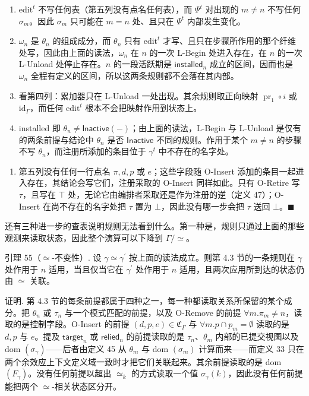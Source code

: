 \documentclass[
  10
]{article}
\providecommand{\tightlist}{%
  \setlength{\itemsep}{0pt}\setlength{\parskip}{0pt}}
\begin{document}
\begin{enumerate}
\def\labelenumi{(\arabic{enumi})}
\item
  $\mathrm{edit}^{t}$ 不写任何表（第五列没有点名任何表），而 $\Psi ^ { t }$ 对出现的 $m \neq n$ 不写任何 $\sigma _ { m }$。因此 $\sigma _ { m }$ 只可能在 $m = n$ 处、且只在 $\Psi ^ { t }$ 内部发生变化。
\item
  $\omega _ { n }$ 是 $\theta _ { n }$ 的组成成分，而 $\theta _ { n }$ 只有 $\mathrm{edit}^{t}$ 才写、且只在步骤所作用的那个纤维处写，因此由上面的读法，$\omega _ { n }$ 在 $n$ 的一次 L-Begin 处进入存在，在 $n$ 的一次 L-Unload 处停止存在。$n$ 的一段活跃期是 $\mathsf{installed}_{n}$ 成立的区间，因而也是 $\omega _ { n }$ 全程有定义的区间，所以这两条规则都不会落在其内部。
\item
  看第四列：累加器只在 L-Unload 一处出现。其余规则取正向映射 $\operatorname { p r } _ { 1 } \circ i$ 或 $\mathrm { i d } _ { \Gamma }$，而任何 $\mathrm{edit}^{t}$ 根本不会把映射作用到状态上。
\item
  installed 即 $\theta _ { n } \neq \mathsf { I n a c t i v e } ( - )$；由上面的读法，L-Begin 与 L-Unload 是仅有的两条前提与结论中 $\theta _ { n }$ 是否 $\mathsf{Inactive}$ 不同的规则。作用于某个 $m \neq n$ 的步骤不写 $\theta _ { n }$，而注册所添加的条目位于 $\gamma ^ { t }$ 中不存在的名字处。
\end{enumerate}

\begin{enumerate}
\def\labelenumi{(\arabic{enumi})}
\setcounter{enumi}{4}
\tightlist
\item
  第五列没有任何一行点名 $\pi , d , p$ 或 $e$；这些字段随 O-Insert 添加的条目一起进入存在，其结论会写它们，注册采取的 O-Insert 同样如此。只有 O-Retire 写 $\tau$，且写在 $\top$ 处，无论它由编排者采取还是作为注册的逆（定义 47）；O-Insert 在尚不存在的名字处把 $\tau$ 置为 $\bot$，因此没有哪一步会把 $\tau$ 送回 $\bot$。$\blacksquare$
\end{enumerate}

还有三种进一步的查表说明规则无法看到什么。第一种是，规则只通过上面的那些观测来读取状态，因此整个演算可以下降到 $\Gamma / \simeq$。

引理 55（$\simeq$-不变性）. 设 $\gamma \simeq \gamma ^ { \prime }$ 按上面的读法成立。则第 4.3 节的一条规则在 $\gamma$ 处作用于 $n$ 适用，当且仅当它在 $\gamma ^ { \prime }$ 处作用于 $n$ 适用，且两次应用所到达的状态仍由 $\simeq$ 关联。

证明. 第 4.3 节的每条前提都属于四种之一，每一种都读取关系所保留的某个成分。把 $\theta _ { n }$ 或 $\tau _ { n }$ 与一个模式匹配的前提，以及 O-Remove 的前提 $\forall m. \pi _ { m } \neq n$，读取的是控制字段。O-Insert 的前提 $( d , p , e ) \in \mathfrak { C } _ { \Gamma }$ 与 $\forall m. p \cap p _ { m } = \emptyset$ 读取的是 $d , p$ 与 $e$。提及 $\mathsf{target}_{n}$ 或 $\mathsf{relied}_{n}$ 的前提读取的是 $\tau _ { n }$、$\theta _ { m }$ 内部的已提交视图以及 dom $\left( \sigma _ { \gamma } \right)$——后者由定义 45 从 $\theta _ { m }$ 与 dom $( \sigma _ { m } )$ 计算而来——而定义 33 只在两个余效应上下文定义域一致时才把它们关联起来。其余前提读取的是 dom $\left( F _ { \gamma } \right)$。没有任何前提以超出 $\simeq_{k}$ 的方式读取一个值 $\sigma _ { \gamma } ( k )$，因此没有任何前提能把两个 $\simeq$-相关状态区分开。
\end{document}
